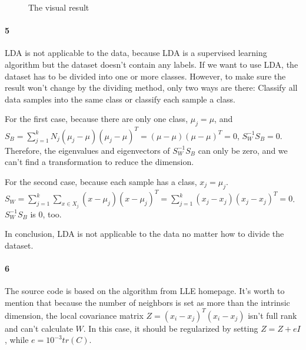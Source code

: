 \documentclass[22pt]{article}
\begin{document}
	\begin{figure}[H]
				\centering
				\caption{The visual result}
			\end{figure}

	\paragraph{5} LDA is not applicable to the data, because LDA is a supervised learning algorithm but the dataset doesn't contain any labels. If we want to use LDA, the dataset has to be divided into one or more classes. However, to make sure the result won't change by the dividing method, only two ways are there: Classify all data samples into the same class or classify each sample a class.

	For the first case, because there are only one class, $\mu_j = \mu$, and $S_B = \sum\limits_{j=1}^{k}N_j(\mu_j- \mu)(\mu_j- \mu)^T = (\mu- \mu)(\mu- \mu)^T = 0 $, $S_W^{-1}S_B=0$.  Therefore, the eigenvalues and eigenvectors of $S_W^{-1}S_B$ can only be zero, and we can't find a transformation to reduce the dimension.

	For the second case, because each sample has a class, $x_j = \mu_j$. $S_W = \sum\limits_{j=1}^{k} \sum\limits_{x\in X_j}(x- \mu_j)(x- \mu_j)^T = \sum\limits_{j=1}^{k}(x_j-x_j)(x_j-x_j)^T=0 $. $S_W^{-1}S_B$ is 0, too. 

	In conclusion, LDA is not applicable to the data no matter how to divide the dataset.
	
	\paragraph{6}
	The source code is based on the algorithm from LLE homepage. It's worth to mention that because the number of neighbors is set as more than the intrinsic dimension, the local covariance matrix $Z=(x_i-x_j)^T(x_i-x_j)$ isn't full rank and can't calculate $W$. In this case, it should be regularized by setting $Z = Z+eI$, while $e = 10^{-3}tr(C)$.
\end{document}
